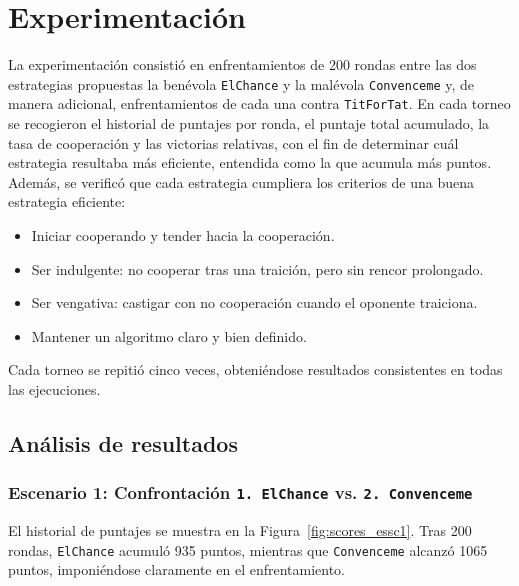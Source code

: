 \documentclass{article}
\begin{document}

\section{Experimentación}\label{sec:exp}

La experimentación consistió en enfrentamientos de 200 rondas entre las 
dos estrategias propuestas la benévola \texttt{ElChance} y la malévola 
\texttt{Convenceme} y, de manera adicional, enfrentamientos de cada una 
contra \texttt{TitForTat}. En cada torneo se recogieron el historial 
de puntajes por ronda, el puntaje total acumulado, la tasa de 
cooperación y las victorias relativas, con el fin de determinar 
cuál estrategia resultaba más eficiente, entendida como la que acumula 
más puntos. Además, se verificó que cada estrategia cumpliera los 
criterios de una buena estrategia eficiente:  
\begin{itemize}  
  \item Iniciar cooperando y tender hacia la cooperación.  
  \item Ser indulgente: no cooperar tras una traición, 
        pero sin rencor prolongado.  
  \item Ser vengativa: castigar con no cooperación cuando el 
        oponente traiciona.  
  \item Mantener un algoritmo claro y bien definido.  
\end{itemize}  
Cada torneo se repitió cinco veces, obteniéndose resultados 
consistentes en todas las ejecuciones.

\subsection{Análisis de resultados}

\subsubsection{Escenario 1: Confrontación 
  \texttt{1. ElChance} vs. \texttt{2. Convenceme}}\label{sec:esc1}

El historial de puntajes se muestra en la Figura~\ref{fig:scores_essc1}. 
Tras 200 rondas, \texttt{ElChance} acumuló 935 puntos, 
mientras que \texttt{Convenceme} alcanzó 1065 puntos, 
imponiéndose claramente en el enfrentamiento.  
\end{document}

